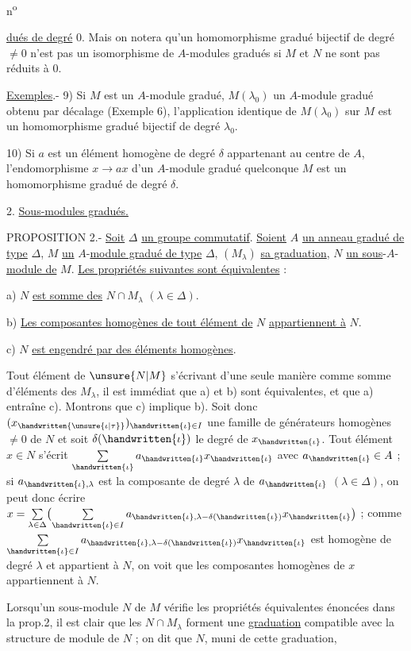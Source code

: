 \begin{flushright}
n\textsuperscript{o}
\end{flushright}

\uline{dués de degré} 0. Mais on notera qu'un homomorphisme gradué bijectif de degré $\ne 0$ n'est pas un isomorphisme de $A$-modules gradués si $M$ et $N$ ne sont pas réduits à 0.

\uline{Exemples}.- 9) Si $M$ est un $A$-module gradué, $M(\lambda_0)$ un $A$-module gradué obtenu par décalage (Exemple 6), l'application identique de $M(\lambda_0)$ sur $M$ est un homomorphisme gradué bijectif de degré $\lambda_0$.

10) Si $a$ est un élément homogène de degré $\delta$ appartenant au centre de $A$, l'endomorphisme $x\to ax$ d'un $A$-module gradué quelconque $M$ est un homomorphisme gradué de degré $\delta$.

2. \uline{Sous-modules gradués.}

PROPOSITION 2.- \uline{Soit} $\Delta$ \uline{un groupe commutatif}. \uline{Soient} $A$ \uline{un anneau gradué de type} $\Delta$, $M$ \uline{un} $A$-\uline{module gradué de type} $\Delta$, $(M_\lambda)$ \uline{sa graduation}, $N$ \uline{un sous}-$A$-\uline{module de} $M$. \uline{Les propriétés suivantes sont équivalentes} :

a) $N$ \uline{est somme des} $N\cap M_\lambda$ $(\lambda\in\Delta)$.

b) \uline{Les composantes homogènes de tout élément de} $N$ \uline{appartiennent à} $N$.

c) $N$ \uline{est engendré par des éléments homogènes}.

Tout élément de $\unsure{N|M}$ s'écrivant d'une seule manière comme somme d'éléments des $M_\lambda$, il est immédiat que a) et b) sont équivalentes, et que a) entraîne c). Montrons que c) implique b). Soit donc $(x_{\handwritten{\unsure{\iota|\tau}}})_{\handwritten{\iota}\in I}$ une famille de générateurs homogènes $\ne 0$ de $N$ et soit $\delta(\handwritten{\iota})$ le degré de $x_{\handwritten{\iota}}$. Tout élément $x\in N$ s'écrit $\sum\limits_{\handwritten{\iota}}a_{\handwritten{\iota}}x_{\handwritten{\iota}}$ avec $a_{\handwritten{\iota}}\in A$ ; si $a_{\handwritten{\iota},\lambda}$ est la composante de degré $\lambda$ de $a_{\handwritten{\iota}}$ $(\lambda\in\Delta)$, on peut donc écrire $x=\sum\limits_{\lambda\in\Delta}\bigl(\sum\limits_{\handwritten{\iota}\in I}a_{\handwritten{\iota},\lambda-\delta(\handwritten{\iota})}x_{\handwritten{\iota}}\bigr)$ ; comme $\sum\limits_{\handwritten{\iota}\in I}a_{\handwritten{\iota},\lambda-\delta(\handwritten{\iota})}x_{\handwritten{\iota}}$ est homogène de degré $\lambda$ et appartient à $N$, on voit que les composantes homogènes de $x$ appartiennent à $N$.

Lorsqu'un sous-module $N$ de $M$ vérifie les propriétés équivalentes énoncées dans la prop.2, il est clair que les $N\cap M_\lambda$ forment une \uline{graduation} compatible avec la structure de module de $N$ ; on dit que $N$, muni de cette graduation,

